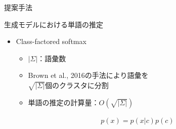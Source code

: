 \documentclass[aspectratio=43,unicode,10pt]{beamer}
\begin{document}
\begin{frame}{提案手法}
  \begin{block}{生成モデルにおける単語の推定}
    \begin{itemize}
      \item Class-factored softmax
        \begin{itemize}
          \item $|\Sigma|$：語彙数
          \item Brown et al., 2016の手法により語彙を \\
                $\sqrt{|\Sigma|}$個のクラスタに分割
          \item 単語の推定の計算量：$O(\sqrt{|\Sigma|})$
        \end{itemize}
        \begin{gather*}
          p(x) = p(x|c)p(c)
        \end{gather*}
    \end{itemize}
  \end{block}
\end{frame}
\end{document}
